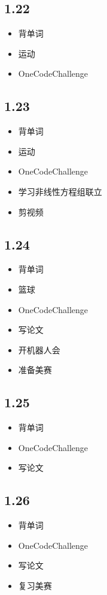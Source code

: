 \documentclass[UTF8]{ctexart}
\begin{document}
\subsection*{1.22}
\begin{itemize}
    \item 背单词
    \item 运动
    \item OneCodeChallenge
\end{itemize}

\subsection*{1.23}
\begin{itemize}
    \item 背单词
    \item 运动
    \item OneCodeChallenge
    \item 学习非线性方程组联立
    \item 剪视频
\end{itemize}

\subsection*{1.24}
\begin{itemize}
    \item 背单词
    \item 篮球
    \item OneCodeChallenge
    \item 写论文
    \item 开机器人会
    \item 准备美赛
\end{itemize}

\subsection*{1.25}
\begin{itemize}
    \item 背单词
    \item OneCodeChallenge
    \item 写论文
\end{itemize}

\subsection*{1.26}
\begin{itemize}
    \item 背单词
    \item OneCodeChallenge
    \item 写论文
    \item 复习美赛
\end{itemize}
\end{document}
